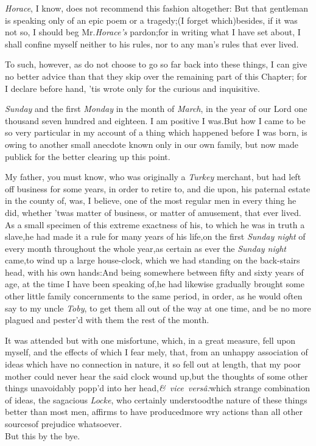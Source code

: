 \documentclass{article}
\begin{document}
\textit{Horace}, I know, does not recommend this fashion
altogether: But that gentleman is speaking only of an epic poem or
a tragedy;\tsk  (I forget which)\tsk besides, if it was not so, I
should beg Mr.\@ \textit{Horace’s} pardon;\tsk  for in writing
what I have set about, I shall confine myself neither to his rules,
nor to any man’s rules that ever lived.

To such, however, as do not choose to 
go so far back into these things, I can\break
give no better advice than that they\break
skip over the remaining part of this\break 
Chapter; for I declare before hand, ’tis
wrote only for the curious and inquisitive.

\noindent
{}\break
{}
\textit{Sunday} and the first
\textit{Monday} in the month of \textit{March}, in the year of our Lord one thousand
seven hundred and eighteen.\break
I am positive I was.\tsk  But how I came to be so very
particular in my account of a thing which happened before I was born, is owing to
another small anecdote known only in our own family, but now made publick for the
better clearing up this point.

My father, you must know, who was originally a \textit{Turkey}
merchant, but had left off business for some years, in order to
retire to, and die upon, his paternal estate in the county of\tsh, 
was, I believe, one of the most regular men in
every thing he did, whether ’twas matter of business, or
matter of amusement, that ever lived. As a small specimen of this
extreme exactness of his, to which he was in truth a slave,\tsk he had
made it a rule for many years of his life,\tsk  on the first
\textit{Sunday night} of every month throughout the whole
year,\tsk  as certain as ever the \textit{Sunday night}
came,\tsk  to wind up a large house-clock, which we had standing
on the back-stairs head, with his own hands:\tsk  And being
somewhere between fifty and sixty years of age, at the time I
have been speaking of,\tsk  he had likewise gradually
brought some other little family concernments to the same period,
in order, as he would often say to my uncle \textit{Toby}, to get
them all out of the way at one time, and be no more plagued
and pester’d with them the rest of the month.

It was attended but with one misfortune, which, in a great
measure, fell upon myself, and the effects of which I fear\break
{}
mely, that, from an unhappy association
of ideas which have no connection in nature, it so fell out at
length, that my poor mother could never hear the said clock wound
up,\tsk  but the thoughts of some other things unavoidably
popp’d into her head,\tsk  \hbox{{\small\itshape\egb\&} \textit{vice
versâ:}}\tsk  which strange combination of ideas, the
sagacious \textit{Locke}, who certainly understood\break the nature of
these things better than most men, affirms to have produced\break more
wry actions than all other sources\break of prejudice whatsoever.\\
\indent But this by the bye.\hfill{}
\end{document}
